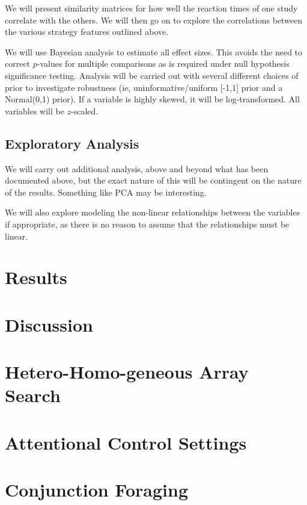 \documentclass[a4paper, oneside, 11pt, onecolumn]{article}
\begin{document}
We will present similarity matrices for how well the reaction times of one study correlate with the others. We will then go on to explore the correlations between the various strategy features outlined above. 

We will use Bayesian analysis to estimate all effect sizes. This avoids the need to correct $p$-values for multiple comparisons as is required under null hypothesis significance testing. Analysis will be carried out with several different choices of prior to investigate robustness (ie, uninformative/uniform [-1,1] prior and a Normal(0,1) prior). If a variable is highly skewed, it will be log-transformed. All variables will be $z$-scaled. 


\subsection{Exploratory Analysis}

We will carry out additional analysis, above and beyond what has been documented above, but the exact nature of this will be contingent on the nature of the results. Something like PCA may be interesting. 

We will also explore modeling the non-linear relationships between the variables if appropriate, as there is no reason to assume that the relationships must be linear. 

\section{Results}

\section{Discussion}


\begin{appendices}
\section{Hetero-Homo-geneous Array Search}

\section{Attentional Control Settings}

\section{Conjunction Foraging}
\end{appendices}



\end{document}
